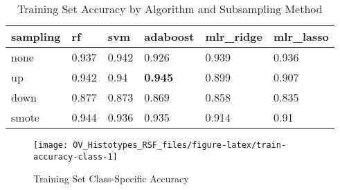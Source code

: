 \documentclass[
]{report}
\begin{document}
\begin{table}

\caption{\label{tab:train-accuracy-table}Training Set Accuracy by Algorithm and Subsampling Method}
\centering
\begin{tabular}[t]{l|l|l|l|l|l}
\hline
sampling & rf & svm & adaboost & mlr\_ridge & mlr\_lasso\\
\hline
none & 0.937 & 0.942 & 0.926 & 0.939 & 0.936\\
\hline
up & 0.942 & 0.94 & \textbf{0.945} & 0.899 & 0.907\\
\hline
down & 0.877 & 0.873 & 0.869 & 0.858 & 0.835\\
\hline
smote & 0.944 & 0.936 & 0.935 & 0.914 & 0.91\\
\hline
\end{tabular}
\end{table}

\begin{figure}[H]

{\centering \texttt{[image: OV\_Histotypes\_RSF\_files/figure-latex/train-accuracy-class-1]} 

}

\caption{Training Set Class-Specific Accuracy}\label{fig:train-accuracy-class}
\end{figure}
\end{document}
